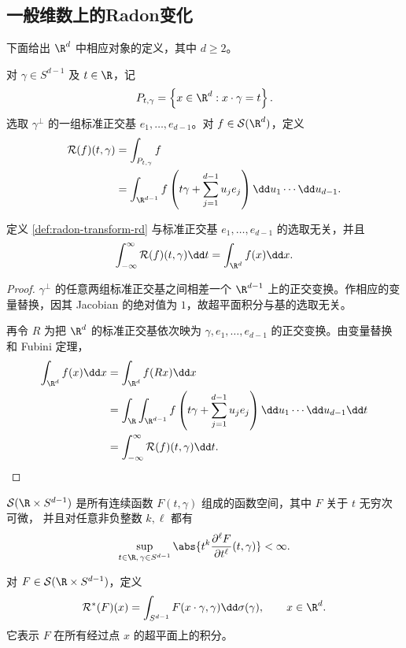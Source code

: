 \subsection*{一般维数上的Radon变化}

下面给出 $\R^d$ 中相应对象的定义，其中 $d\geq2$。

\begin{definition}[$\R^d$ 中的 Radon 变换]
	\label{def:radon-transform-rd}
	对 $\gamma\in S^{d-1}$ 及 $t\in\R$，记
	\[
	P_{t,\gamma}
	=\left\{x\in\R^d:x\cdot\gamma=t\right\}.
	\]
	选取 $\gamma^\perp$ 的一组标准正交基
	$e_1,\ldots,e_{d-1}$。对 $f\in\mathcal S(\R^d)$，定义
	\[
	\begin{aligned}
	\mathcal R(f)(t,\gamma)
	&=\int_{P_{t,\gamma}}f\\
	&=\int_{\R^{d-1}}
	f\left(t\gamma+\sum_{j=1}^{d-1}u_je_j\right)
	\dd u_1\cdots\dd u_{d-1}.
	\end{aligned}
	\]
\end{definition}
\begin{proposition}\label{prop:plane-integral-well-defined-rd}
	定义 \ref{def:radon-transform-rd} 与标准正交基
	$e_1,\ldots,e_{d-1}$ 的选取无关，并且
	\[
	\int_{-\infty}^{\infty}\mathcal R(f)(t,\gamma)\dd t
	=\int_{\R^d}f(x)\dd x.
	\]
\end{proposition}

\begin{proof}
	$\gamma^\perp$ 的任意两组标准正交基之间相差一个
	$\R^{d-1}$ 上的正交变换。作相应的变量替换，因其 Jacobian
	的绝对值为 $1$，故超平面积分与基的选取无关。
	
	再令 $R$ 为把 $\R^d$ 的标准正交基依次映为
	$\gamma,e_1,\ldots,e_{d-1}$ 的正交变换。由变量替换和
	Fubini 定理，
	\[
	\begin{aligned}
		\int_{\R^d}f(x)\dd x
		&=\int_{\R^d}f(Rx)\dd x\\
		&=\int_{\R}\int_{\R^{d-1}}
		f\left(t\gamma+\sum_{j=1}^{d-1}u_je_j\right)
		\dd u_1\cdots\dd u_{d-1}\dd t\\
		&=\int_{-\infty}^{\infty}
		\mathcal R(f)(t,\gamma)\dd t.
	\end{aligned}
	\]
\end{proof}


	$\mathcal S(\R\times S^{d-1})$ 是所有连续函数
	$F(t,\gamma)$ 组成的函数空间，其中 $F$ 关于 $t$ 无穷次可微，
	并且对任意非负整数 $k,\ell$ 都有
	\[
	\sup_{t\in\R,\,\gamma\in S^{d-1}}
	\abs{t^k\frac{\partial^\ell F}{\partial t^\ell}(t,\gamma)}
	<\infty.
	\]


\begin{definition}
	\label{def:dual-radon-transform-rd}
	对 $F\in\mathcal S(\R\times S^{d-1})$，定义
	\[
	\mathcal R^*(F)(x)
	=\int_{S^{d-1}}F(x\cdot\gamma,\gamma)
	\dd\sigma(\gamma),
	\qquad x\in\R^d.
	\]
	它表示 $F$ 在所有经过点 $x$ 的超平面上的积分。
\end{definition}



